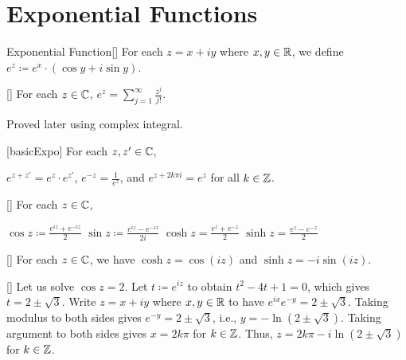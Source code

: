 \documentclass[../complex_variables_1.tex]{subfiles}
\begin{document}
\section{Exponential Functions}

\begin{Definition}{Exponential Function}[]
    For each \(z = x + iy\) where \(x, y \in \RR\), we define
    \(e^z \coloneqq e^x \cdot (\cos y + i \sin y)\).
\end{Definition}

\begin{Theorem}{}[]
    For each \(z \in \CC\), \(e^z = \sum_{j=1}^\infty \frac{z^j}{j!}\).
\end{Theorem}
\begin{myproof}[Proof]
    Proved later using complex integral.
\end{myproof}

\begin{Theorem}{}[basicExpo]
    For each \(z, z' \in \CC\),
    \begin{enumerate}[label=(\alph*)]
        \ii \(e^{z+z'} = e^z \cdot e^{z'}\),
        \ii \(e^{-z} = \frac{1}{e^z}\), and
        \ii \(e^{z+2k\pi i} = e^z\) for all \(k \in \ZZ\).
    \end{enumerate}
\end{Theorem}

\begin{Definition}{}[]
    For each \(z \in \CC\),
    \begin{enumerate}[label=(\arabic*)]
        \ii \(\cos z \coloneqq \frac{e^{iz}+e^{-iz}}{2}\)
        \ii \(\sin z \coloneqq \frac{e^{iz}-e^{-iz}}{2i}\)
        \ii \(\cosh z = \frac{e^z + e^{-z}}{2}\)
        \ii \(\sinh z = \frac{e^z - e^{-z}}{2}\)
    \end{enumerate}
\end{Definition}

\begin{Theorem}{}[]
    For each \(z \in \CC\), we have \(\cosh z = \cos(iz)\)
    and \(\sinh z = -i \sin(iz)\).
\end{Theorem}

\begin{Example}{}[]
    Let us solve \(\cos z = 2\).
    Let \(t \coloneqq e^{iz}\) to obtain \(t^2 - 4t + 1 = 0\),
    which gives \(t = 2 \pm \sqrt{3}\).
    Write \(z = x + iy\) where \(x, y \in \RR\)
    to have \(e^{ix} e^{-y} = 2 \pm\sqrt{3}\).
    Taking modulus to both sides gives \(e^{-y} = 2 \pm \sqrt{3}\),
    i.e., \(y = -\ln (2 \pm \sqrt{3})\).
    Taking argument to both sides gives \(x = 2k\pi\)
    for \(k \in \ZZ\).
    Thus, \(z = 2k\pi - i \ln(2\pm\sqrt{3})\)
    for \(k \in \ZZ\).
\end{Example}
\end{document}
